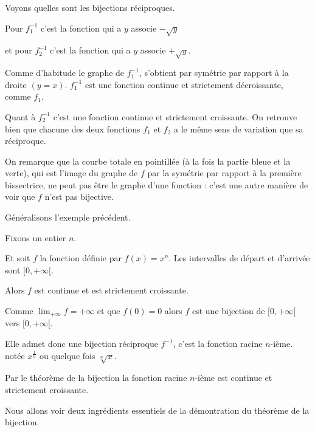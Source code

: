 \change

Voyons quelles sont les bijections réciproques.

Pour $f_1^{-1}$ c'est la fonction qui a $y$ associe $-\sqrt{y}$

et pour $f_2^{-1}$ c'est la fonction qui a $y$ associe $+\sqrt{y}$.

\change

Comme d'habitude le graphe de $f_1^{-1}$, s'obtient par symétrie par rapport à la droite $(y=x)$.
$f_1^{-1}$ est une fonction continue et strictement décroissante, comme $f_1$.

\change

Quant à $f_2^{-1}$ c'est une fonction continue et strictement croissante. On retrouve bien que chacune 
des deux fonctions $f_1$ et $f_2$ a le même sens de variation que sa réciproque. 



On remarque que la courbe totale en pointillée (à la fois la partie bleue et la verte), 
qui est l'image du graphe de $f$ par la symétrie 
par rapport à la première bissectrice, ne peut pas être le graphe d'une fonction : 
c'est une autre manière de voir que $f$ n'est pas bijective.




\diapo

Généralisons l'exemple précédent.

Fixons un entier  $n$. 

Et soit $f$ la fonction définie par $f(x)=x^n$. Les intervalles de départ et d'arrivée sont $[0,+\infty[$.


\change

Alors $f$ est continue et est strictement croissante.

\change

Comme 
$\lim_{+\infty} f = +\infty$ et que $f(0)=0$ alors $f$ est une bijection
de $[0,+\infty[$ vers $[0,+\infty[$.

\change

Elle admet donc une bijection réciproque $f^{-1}$,
c'est la fonction racine $n$-ième. 
notée  $x^{\frac{1}{n}}$ ou quelque fois $\sqrt[n]{x}$.

\change

Par le théorème de la bijection la fonction racine $n$-ième est 
continue et strictement croissante.


\diapo

Nous allons voir deux ingrédients essentiels de la démontration du théorème de la bijection.

